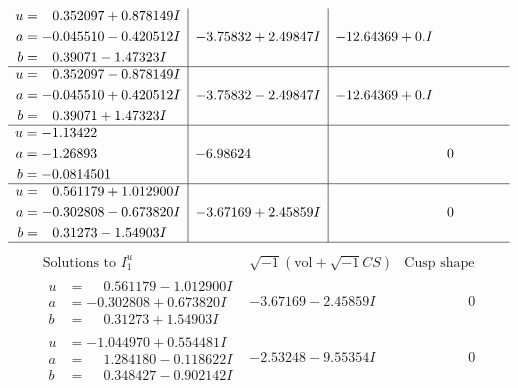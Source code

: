 \documentclass[1p]{elsarticle_modified}
\theoremstyle{definition}
\newcommand{\I}{\sqrt{-1}}
\begin{document}
$$\begin{array}{c|c|c}
\begin{aligned}
u &= \phantom{-}0.352097 + 0.878149 I \\
a &= -0.045510 - 0.420512 I \\
b &= \phantom{-}0.39071 - 1.47323 I\end{aligned}
 & -3.75832 + 2.49847 I & -12.64369 + 0. I\phantom{ +0.000000I} \\ \hline\begin{aligned}
u &= \phantom{-}0.352097 - 0.878149 I \\
a &= -0.045510 + 0.420512 I \\
b &= \phantom{-}0.39071 + 1.47323 I\end{aligned}
 & -3.75832 - 2.49847 I & -12.64369 + 0. I\phantom{ +0.000000I} \\ \hline\begin{aligned}
u &= -1.13422\phantom{ +0.000000I} \\
a &= -1.26893\phantom{ +0.000000I} \\
b &= -0.0814501\phantom{ +0.000000I}\end{aligned}
 & -6.98624\phantom{ +0.000000I} & \phantom{-0.000000 } 0 \\ \hline\begin{aligned}
u &= \phantom{-}0.561179 + 1.012900 I \\
a &= -0.302808 - 0.673820 I \\
b &= \phantom{-}0.31273 - 1.54903 I\end{aligned}
 & -3.67169 + 2.45859 I & \phantom{-0.000000 } 0\\
 \hline 
 \end{array}$$\newpage$$\begin{array}{c|c|c}  
\text{Solutions to }I^u_{1}& \I (\text{vol} + \sqrt{-1}CS) & \text{Cusp shape}\\
 \hline 
\begin{aligned}
u &= \phantom{-}0.561179 - 1.012900 I \\
a &= -0.302808 + 0.673820 I \\
b &= \phantom{-}0.31273 + 1.54903 I\end{aligned}
 & -3.67169 - 2.45859 I & \phantom{-0.000000 } 0 \\ \hline\begin{aligned}
u &= -1.044970 + 0.554481 I \\
a &= \phantom{-}1.284180 - 0.118622 I \\
b &= \phantom{-}0.348427 - 0.902142 I\end{aligned}
 & -2.53248 - 9.55354 I & \phantom{-0.000000 } 0 \\ \hline\begin{aligned}

\end{aligned}
\end{array}$$
\end{document}
